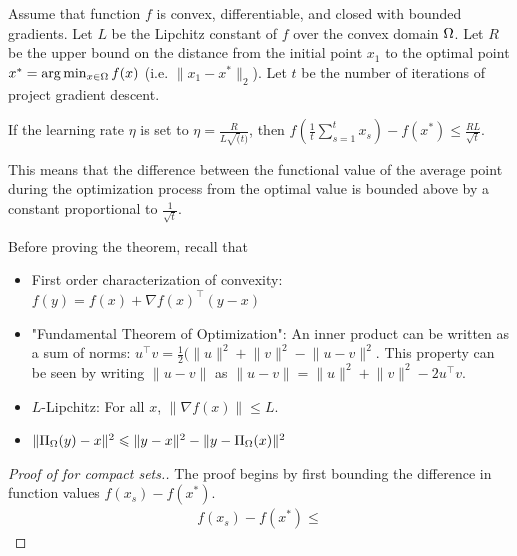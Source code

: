 \begin{theorem}
Assume that function $f$ is convex, differentiable, and closed with bounded gradients. Let $L$ be the Lipchitz constant of $f$ over the convex domain $\Omega$. Let $R$ be the upper bound on the distance from the initial point $x_1$ to the optimal point $x^* = \arg\min_{x \in \Omega} f(x)$ (i.e. $\lVert x_1 - x^* \rVert_2$). Let $t$ be the number of iterations of project gradient descent.

If the learning rate $\eta$ is set to $\eta=\frac{R}{L \sqrt(t)}$, then $f\left(\frac{1}{t}\sum_{s=1}^t x_s\right) - f\left(x^*\right) \leq \frac{RL}{\sqrt{t}}$.

This means that the difference between the functional value of the average point during the optimization process from the optimal value is bounded above by a constant proportional to $\frac{1}{\sqrt{t}}$.

\end{theorem}

Before proving the theorem, recall that
\begin{itemize}
    \item First order characterization of convexity: $f(y) = f(x) + \nabla f(x)^\top (y - x)$
    \item "Fundamental Theorem of Optimization": An inner product can be written as a sum of norms: $u^\top v = \frac{1}{2}(\lVert u \rVert^2 + \lVert v \lVert^2 - \lVert u - v \rVert^2$. This property can be seen by writing $\lVert u - v \rVert$ as $\lVert u - v \rVert = \lVert u \rVert^2 + \lVert v \lVert^2 - 2 u^\top v$.
    \item $L$-Lipchitz: For all $x$, $\lVert \nabla f(x) \rVert \leq L$.
    \item $\lVert \Pi_\Omega (y) - x \rVert^2 \leqslant \lVert y - x \rVert^2 - \lVert y - \Pi_\Omega (x) \rVert^2$ %
\end{itemize}


\begin{proof}[Proof of  for compact sets.]
The proof begins by first bounding the difference in function values $f(x_s) - f(x^*)$.
\begin{align}
    f(x_s) - f(x^*) \leq
\end{align}
\end{proof}
